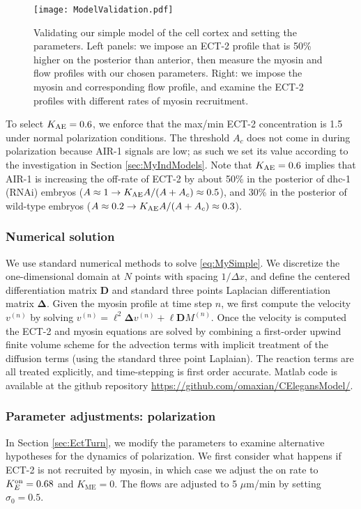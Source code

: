 \documentclass[11pt]{article}
\newcommand{\M}[1]{\boldsymbol{#1}}
\begin{document}
\begin{appendix}
\begin{figure}
\centering
\texttt{[image: ModelValidation.pdf]}
\caption{\label{fig:CortexMod}Validating our simple model of the cell cortex and setting the parameters. Left panels: we impose an ECT-2 profile that is 50\% higher on the posterior than anterior, then measure the myosin and flow profiles with our chosen parameters. Right: we impose the myosin and corresponding flow profile, and examine the ECT-2 profiles with different rates of myosin recruitment.}
\end{figure}

To select $K_\text{AE}=0.6$, we enforce that the max/min ECT-2 concentration is 1.5 under normal polarization conditions. The threshold $A_c$ does not come in during polarization because AIR-1 signals are low; as such we set its value according to the investigation in Section \ref{sec:MyIndModels}. Note that $K_\text{AE}=0.6$ implies that AIR-1 is increasing the off-rate of ECT-2 by about 50\% in the posterior of dhc-1 (RNAi) embryos ($A \approx 1 \rightarrow K_\text{AE} A/(A+A_c) \approx 0.5$), and 30\% in the posterior of wild-type embryos ($A \approx 0.2 \rightarrow K_\text{AE} A/(A+A_c) \approx 0.3$).

\subsubsection{Numerical solution}
We use standard numerical methods to solve \eqref{eq:MySimple}. We discretize the one-dimensional domain at $N$ points with spacing $1/\Delta x$, and define the centered differentiation matrix $\M{D}$ and standard three points Laplacian differentiation matrix $\M{\Delta}$. Given the myosin profile at time step $n$, we first compute the velocity $v^{(n)}$ by solving $v^{(n)} = \ell^2 \M{\Delta} v^{(n)} + \ell \M{D} M^{(n)}$. Once the velocity is computed the ECT-2 and myosin equations are solved by combining a first-order upwind finite volume scheme for the advection terms \citep[Sec.~1.4]{hundsdorfer2003numerical} with implicit treatment of the diffusion terms (using the standard three point Laplaian). The reaction terms are all treated explicitly, and time-stepping is first order accurate. Matlab code  is available at the github repository \url{https://github.com/omaxian/CElegansModel/}.

\subsubsection{Parameter adjustments: polarization \label{sec:EctTurnP}}
In Section \ref{sec:EctTurn}, we modify the parameters to examine alternative hypotheses for the dynamics of polarization. We first consider what happens if ECT-2 is not recruited by myosin, in which case we adjust the on rate to $K^\text{on}_E=0.68$ and $K_\text{ME}=0$. The flows are adjusted to 5 $\mu$m/min by setting $\sigma_0=0.5$. 


\end{appendix}
\end{document}

